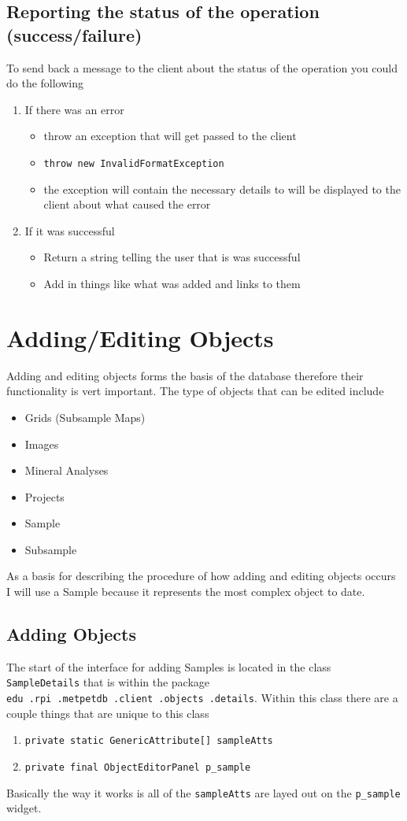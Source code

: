 \documentclass[10pt,letterpaper,onecolumn,oneside]{report}
\begin{document}
\section{Reporting the status of the operation (success/failure)}
To send back a message to the client about the status of the operation you could do the following
\begin{enumerate}
\item If there was an error
\begin{itemize}
\item throw an exception that will get passed to the client
\item \texttt{throw new InvalidFormatException}
\item the exception will contain the necessary details to will be displayed to the client about what caused the error
\end{itemize}
\item If it was successful
\begin{itemize}
\item Return a string telling the user that is was successful
\item Add in things like what was added and links to them
\end{itemize}
\end{enumerate}
\chapter{Adding/Editing Objects}
Adding and editing objects forms the basis of the database therefore their functionality
is vert important.  The type of objects that can be edited include
\begin{itemize}
\item Grids (Subsample Maps)
\item Images
\item Mineral Analyses
\item Projects
\item Sample
\item Subsample
\end{itemize}
As a basis for describing the procedure of how adding and editing objects occurs I will use
a Sample because it represents the most complex object to date.
\section{Adding Objects}
The start of the interface for adding Samples is located in the class \texttt{SampleDetails}
that is within the package \texttt{edu\ .rpi\ .metpetdb\ .client\ .objects\ .details}. 
Within this class there are a couple things that are unique to this class
\begin{enumerate}
\item \texttt{private static GenericAttribute[] sampleAtts}
\item \texttt{private final ObjectEditorPanel p\_sample}
\end{enumerate}
Basically the way it works is all of the \texttt{sampleAtts} are layed
out on the \texttt{p\_sample} widget.
\end{document}
